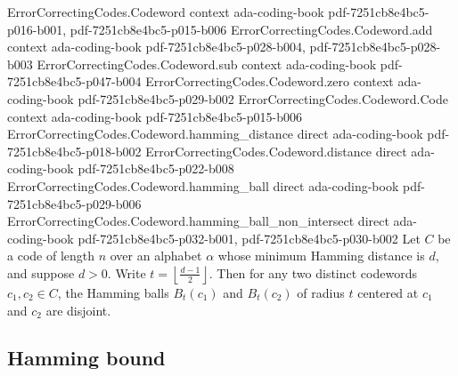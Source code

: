 \begin{lemma}
\label{ErrorCorrectingCodes.Codeword.hamming_ball'_disjoint}
\leanok
{}
\proofstep
  {ErrorCorrectingCodes.Codeword}
  {context}
  {ada-coding-book}
  {pdf-7251cb8e4bc5-p016-b001,
    pdf-7251cb8e4bc5-p015-b006}
\proofstep
  {ErrorCorrectingCodes.Codeword.add}
  {context}
  {ada-coding-book}
  {pdf-7251cb8e4bc5-p028-b004,
    pdf-7251cb8e4bc5-p028-b003}
\proofstep
  {ErrorCorrectingCodes.Codeword.sub}
  {context}
  {ada-coding-book}
  {pdf-7251cb8e4bc5-p047-b004}
\proofstep
  {ErrorCorrectingCodes.Codeword.zero}
  {context}
  {ada-coding-book}
  {pdf-7251cb8e4bc5-p029-b002}
\proofstep
  {ErrorCorrectingCodes.Codeword.Code}
  {context}
  {ada-coding-book}
  {pdf-7251cb8e4bc5-p015-b006}
\proofstep
  {ErrorCorrectingCodes.Codeword.hamming_distance}
  {direct}
  {ada-coding-book}
  {pdf-7251cb8e4bc5-p018-b002}
\proofstep
  {ErrorCorrectingCodes.Codeword.distance}
  {direct}
  {ada-coding-book}
  {pdf-7251cb8e4bc5-p022-b008}
\proofstep
  {ErrorCorrectingCodes.Codeword.hamming_ball}
  {direct}
  {ada-coding-book}
  {pdf-7251cb8e4bc5-p029-b006}
\proofstep
  {ErrorCorrectingCodes.Codeword.hamming_ball_non_intersect}
  {direct}
  {ada-coding-book}
  {pdf-7251cb8e4bc5-p032-b001,
    pdf-7251cb8e4bc5-p030-b002}
Let $C$ be a code of length $n$ over an alphabet $\alpha$ whose minimum Hamming distance
is $d$, and suppose $d > 0$. Write $t = \left\lfloor \frac{d-1}{2} \right\rfloor$. Then
for any two distinct codewords $c_1, c_2 \in C$, the Hamming balls $B_t(c_1)$ and
$B_t(c_2)$ of radius $t$ centered at $c_1$ and $c_2$ are disjoint.
\end{lemma}

\subsection{Hamming bound}


